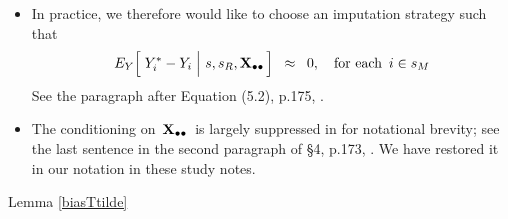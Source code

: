 \begin{remark}\label{remarkSmallUnitBias}
\mbox{}
\vskip -0.1cm
\noindent
\begin{itemize}
\item
    In practice, we therefore would like to choose an imputation strategy such that
    \begin{equation*}
    E_{Y}\!\left[\,
        \left.
        Y^{*}_{i} \overset{{\color{white}.}}{-} Y_{i}
        \;\right\vert\,
        s,s_{R},\Xobs
        \,\right]
    \;\; \approx \;\;
        0,
    \quad
    \textnormal{for each \,$i \in s_{M}$}
    \end{equation*}
    See the paragraph after Equation (5.2), p.175, \cite{Beaumont2011}.
\item
    The conditioning on \,$\mathbf{X}_{\bullet\bullet}$\, is largely suppressed in \cite{Beaumont2011} for notational brevity;
    see the last sentence in the second paragraph of \S4, p.173, \cite{Beaumont2011}.
    We have restored it in our notation in these study notes.
\end{itemize}
\end{remark}
\proofof Lemma \ref{biasTtilde}
\vskip 0.1cm
\renewcommand{\theenumi}{\roman{enumi}}
\renewcommand{\labelenumi}{\mbox{}\;\;\,(\theenumi)$\quad$}
